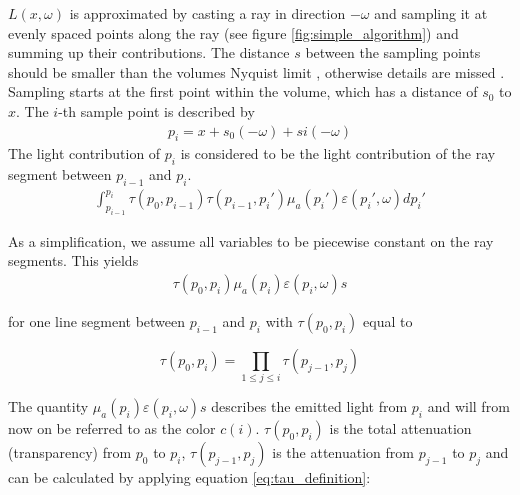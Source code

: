 $L({x},\omega )$ is approximated by casting a ray in direction $-\omega$ and sampling it at evenly spaced points along the ray (see figure \ref{fig:simple_algorithm}) and summing up their contributions\cite{511}. The distance $s$ between the sampling points should be smaller than the volumes Nyquist limit \cite{659497}, otherwise details are missed \cite{10.1145/2661229.2661292}.
Sampling starts at the first point within the volume, which has a distance of $s_0$ to ${x}$. The $i$-th sample point is described by
\begin{align*}
p_i={x} + s_0(-\omega) + si(-\omega)
\end{align*}
The light contribution of $p_i$ is considered to be the light contribution of the ray segment between $p_{i-1}$ and $p_i$.
\begin{align*}
\int_{p_{i-1}}^{p_i} \tau (p_0,p_{i-1}) \tau(p_{i-1},p_{i}') \mu_a(p_{i}')\varepsilon (p_{i}', \omega)dp_{i}'
\end{align*} 



As a simplification, we assume all variables to be piecewise constant\cite{10.1145/147130.147155} on the ray segments. This yields
\begin{align*}
\tau(p_0, p_i) \mu_a(p_{i})\varepsilon (p_{i}, \omega)s
\end{align*} 


for one line segment between $p_{i-1}$ and $p_i$ with $\tau(p_0, p_i)$ equal to


\begin{equation}\label{eq:discrete_tau_approx}
\tau(p_0, p_i)=\prod_{1\le j \le i}{\tau(p_{j-1}, p_j)}
\end{equation} 



The quantity $\mu_a(p_{i})\varepsilon (p_{i}, \omega)s$ describes the emitted light from $p_i$ and will from now on be referred to as the color $c(i)$. $\tau(p_0, p_i)$ is the total attenuation (transparency) from $p_0$ to $p_i$, $\tau(p_{j-1}, p_j)$ is the attenuation from $p_{j-1}$ to $p_j$ and can be calculated by applying equation \ref{eq:tau_definition}: 



